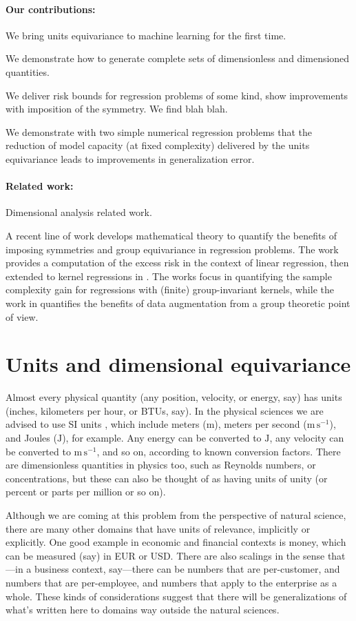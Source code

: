 \documentclass[nohyperref]{article}
\theoremstyle{plain}
\theoremstyle{definition}
\theoremstyle{remark}
\newcommand{\unit}[1]{\mathrm{#1}}
\newcommand{\m}{\unit{m}}
\newcommand{\s}{\unit{s}}
\newcommand{\J}{\unit{J}}
\begin{document}
\paragraph{Our contributions:}
We bring units equivariance to machine learning for the first time.

We demonstrate how to generate complete sets of dimensionless and dimensioned quantities.

We deliver risk bounds for regression problems of some kind, show improvements with imposition of the symmetry. We find blah blah.

We demonstrate with two simple numerical regression problems that the reduction of model capacity (at fixed complexity) delivered by the units equivariance leads to improvements in generalization error.


\paragraph{Related work:}
Dimensional analysis related work.

A recent line of work develops mathematical theory to quantify the benefits of imposing symmetries and group equivariance in regression problems. The work \cite{} provides a computation of the excess risk in the context of linear regression, then extended to kernel regressions in \cite{}. The works \cite{} focus in quantifying the sample complexity gain for regressions with (finite) group-invariant kernels, while the work in \cite{} quantifies the benefits of data augmentation from a group theoretic point of view. 


\section{Units and dimensional equivariance}

Almost every physical quantity (any position, velocity, or energy, say) has units (inches, kilometers per hour, or BTUs, say).
In the physical sciences we are advised to use SI units \cite{si}, which include meters ($\m$), meters per second ($\m\,\s^{-1}$), and Joules ($\J$), for example.
Any energy can be converted to $\J$, any velocity can be converted to $\m\,\s^{-1}$, and so on, according to known conversion factors.
There are dimensionless quantities in physics too, such as Reynolds numbers, or concentrations, but these can also be thought of as having units of unity (or percent or parts per million or so on).

Although we are coming at this problem from the perspective of natural science, there are many other domains that have units of relevance, implicitly or explicitly.
One good example in economic and financial contexts is money, which can be measured (say) in EUR or USD.
There are also scalings in the sense that---in a business context, say---there can be numbers that are per-customer, and numbers that are per-employee, and numbers that apply to the enterprise as a whole.
These kinds of considerations suggest that there will be generalizations of what's written here to domains way outside the natural sciences.
\end{document}
